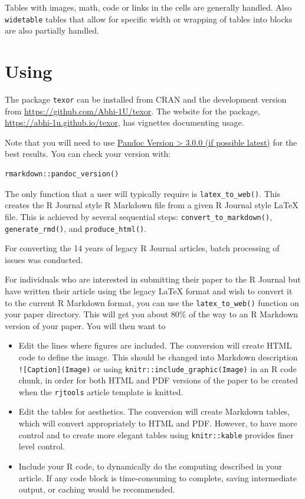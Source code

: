 Tables with images, math, code or links in the cells are generally handled. Also \texttt{widetable} tables that allow for specific width or wrapping of tables into blocks are also partially handled.

\hypertarget{texor}{%
\section{\texorpdfstring{Using }{Using }}\label{texor}}

The package \texttt{texor} can be installed from CRAN and the development version from \url{https://github.com/Abhi-1U/texor}. The website for the package, \url{https://abhi-1u.github.io/texor}, has vignettes documenting usage.

Note that you will need to use \href{(https://pandoc.org/installing.html)}{Pandoc Version \textgreater{} 3.0.0 (if possible latest)} for the best results. You can check your version with:

\begin{verbatim}
rmarkdown::pandoc_version()
\end{verbatim}

The only function that a user will typically require is \texttt{latex\_to\_web()}. This creates the R Journal style R Markdown file from a given R Journal style LaTeX file.
This is achieved by several sequential steps: \texttt{convert\_to\_markdown()}, \texttt{generate\_rmd()}, and \texttt{produce\_html()}.

For converting the 14 years of legacy R Journal articles, batch processing of issues was conducted.

For individuals who are interested in submitting their paper to the R Journal but have written their article using the legacy LaTeX format and wish to convert it to the current R Markdown format, you can use the \texttt{latex\_to\_web()} function on your paper directory. This will get you about 80\% of the way to an R Markdown version of your paper. You will then want to

\begin{itemize}
\tightlist
\item
  Edit the lines where figures are included. The conversion will create HTML code to define the image. This should be changed into Markdown description \texttt{!{[}Caption{]}(Image)} or using \texttt{knitr::include\_graphic(Image)} in an R code chunk, in order for both HTML and PDF versions of the paper to be created when the \texttt{rjtools} article template is knitted.
\item
  Edit the tables for aesthetics. The conversion will create Markdown tables, which will convert appropriately to HTML and PDF. However, to have more control and to create more elegant tables using \texttt{knitr::kable} provides finer level control.
\item
  Include your R code, to dynamically do the computing described in your article. If any code block is time-consuming to complete, saving intermediate output, or caching would be recommended.
\end{itemize}

